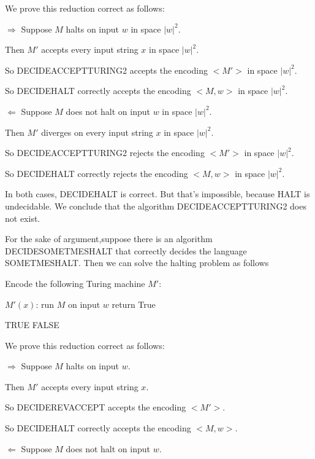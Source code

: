 \documentclass[12pt,a4paper]{article}
\newcommand{\question}[1]{\bigskip\noindent{\textbf{Q{#1} solution}}}
\begin{document}
We prove this reduction correct as follows:

$\Longrightarrow$ Suppose $M$ halts on input $w$ in space ${|w|}^2$.
     
	  Then $M'$ accepts every input string $x$ in space ${|w|}^2$.

	  So DECIDEACCEPTTURING2 accepts the encoding $<M'>$ in space ${|w|}^2$.

	  So DECIDEHALT correctly accepts the encoding $<M,w>$ in space ${|w|}^2$.


$\Longleftarrow$ Suppose $M$ does not halt on input $w$ in space ${|w|}^2$.

     Then $M'$ diverges on every input string $x$ in space ${|w|}^2$.

	 So DECIDEACCEPTTURING2 rejects the encoding $<M'>$ in space ${|w|}^2$.

	 So DECIDEHALT correctly rejects the encoding $<M,w>$ in space ${|w|}^2$.

In both cases, DECIDEHALT is correct. But that's impossible, because HALT is undecidable. We conclude that the algorithm DECIDEACCEPTTURING2 does not exist.

\question{36.A}

For the sake of argument,suppose there is an algorithm DECIDESOMETMESHALT that correctly decides the language SOMETMESHALT. Then we can solve the halting problem as follows
\begin{algorithm}
	\begin{algorithmic}
		\State Encode the following Turing machine $M'$:

		\State\quad$M'(x)$:
		\State\quad\quad run $M$ on input $w$
		\State\quad\quad return True
		
		\State \Return TRUE
		\Else{}
		\State \Return FALSE 
		\EndIf
		\EndFunction
	\end{algorithmic}
\end{algorithm}

We prove this reduction correct as follows:

$\Longrightarrow$ Suppose $M$ halts on input $w$.
     
	  Then $M'$ accepts every input string $x$.


	  So DECIDEREVACCEPT accepts the encoding $<M'>$.

	  So DECIDEHALT correctly accepts the encoding $<M,w>$.


$\Longleftarrow$ Suppose $M$ does not halt on input $w$.
\end{document}
